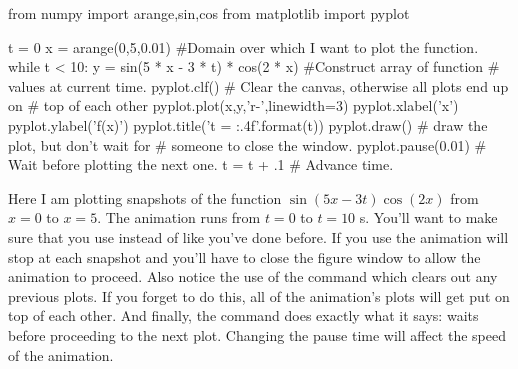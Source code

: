 \begin{codeexample}
\begin{VerbatimOut}{\listingFile}
from numpy import arange,sin,cos
from matplotlib import pyplot

t = 0
x = arange(0,5,0.01)   #Domain over which I want to plot the function.
 while t < 10:
    y = sin(5 * x - 3 * t) * cos(2 * x)  #Construct array of function
                                         # values at current time.
    pyplot.clf()  # Clear the canvas, otherwise all plots end up on
                  # top of each other
    pyplot.plot(x,y,'r-',linewidth=3)
    pyplot.xlabel('x')
    pyplot.ylabel('f(x)')
    pyplot.title('t = {:.4f}'.format(t))
    pyplot.draw()           # draw the plot, but don't wait for
                            # someone to close the window.
    pyplot.pause(0.01)      # Wait before plotting the next one.
    t = t + .1              # Advance time.
\end{VerbatimOut}
\end{codeexample}

Here I am plotting snapshots of the function $\sin(5 x - 3 t) \cos(2
x)$ from $x = 0$ to $x=5$.  The animation runs from $t=0$ to $t=10$ s.
You'll want to make sure that you use  instead of
 like you've done before.  If you use
 the animation will stop at each snapshot and
you'll have to close the figure window to allow the animation to
proceed.  Also notice the use of the  command which
clears out any previous plots.  If you forget to do this, all of the
animation's plots will get put on top of each other.  And finally, the
 command does exactly what it says: waits
before proceeding to the next plot. Changing the pause time will affect the speed of
the animation.

